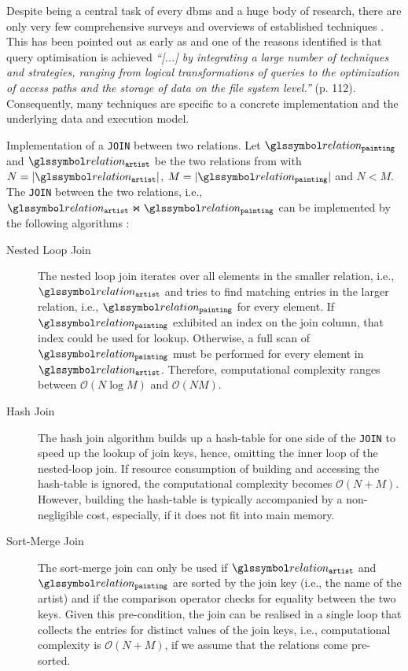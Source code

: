 Despite being a central task of every \acrshort{dbms} and a huge body of research, there are only very few comprehensive surveys and overviews of established techniques \cite{Jarke:1984Query,Graefe:1993Query,Chaudhuri:1998An}. This has been pointed out as early as \citeyear{Jarke:1984Query} and one of the reasons identified is that query optimisation is achieved \emph{``[...] by integrating a large number of techniques and strategies, ranging from logical transformations of queries to the optimization of access paths and the storage of data on the file system level.''} \cite{Jarke:1984Query} (p. 112). Consequently, many techniques are specific to a concrete implementation and the underlying data and execution model.

\begin{example}[label=example:join_algorithm]{Implementation of a \texttt{JOIN} between two relations.}{}
    Let $\relation_{\mathtt{painting}}$ and $\relation_{\mathtt{artist}}$ be the two relations from  with $N = |\relation_{\mathtt{artist}}|$, $M = |\relation_{\mathtt{painting}}|$ and $N < M$. The \texttt{JOIN} between the two relations, i.e., $\relation_{\mathtt{artist}} \Join \relation_{\mathtt{painting}}$ can be implemented by the following algorithms \cite{Graefe:1993Query}:

    \begin{description}
        \item[Nested Loop Join] The nested loop join iterates over all elements in the smaller relation, i.e., $\relation_{\mathtt{artist}}$ and tries to find matching entries in the larger relation, i.e., $\relation_{\mathtt{painting}}$ for every element. If $\relation_{\mathtt{painting}}$ exhibited an index on the join column, that index could be used for lookup. Otherwise, a full scan of $\relation_{\mathtt{painting}}$ must be performed for every element in $\relation_{\mathtt{artist}}$. Therefore, computational complexity ranges between $\mathcal{O}(N \log M)$ and $\mathcal{O}(NM)$.
        \item[Hash Join] The hash join algorithm builds up a hash-table for one side of the  \texttt{JOIN} to speed up the lookup of join keys, hence, omitting the inner loop of the nested-loop join. If resource consumption of building and accessing the hash-table is ignored, the computational complexity becomes $\mathcal{O}(N + M)$. However, building the hash-table is typically accompanied by a non-negligible cost, especially, if it does not fit into main memory.
        \item[Sort-Merge Join] The sort-merge join can only be used if $\relation_{\mathtt{artist}}$ and $\relation_{\mathtt{painting}}$ are sorted by the join key (i.e., the name of the artist) and if the comparison operator checks for equality between the two keys. Given this pre-condition, the join can be realised in a single loop that collects the entries for distinct values of the join keys, i.e.,  computational complexity is  $\mathcal{O}(N + M)$, if we assume that the relations come pre-sorted.  
    \end{description}
\end{example}

